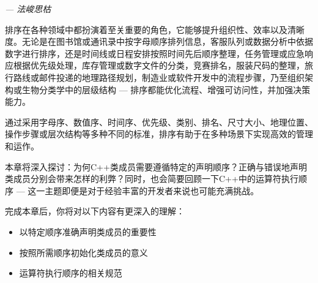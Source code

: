 
\begin{flushright}
\textit{--- 法峻思枯}
\end{flushright}

排序在各种领域中都扮演着至关重要的角色，它能够提升组织性、效率以及清晰度。无论是在图书馆或通讯录中按字母顺序排列信息，客服队列或数据分析中依据数字进行排序，还是时间线或日程安排按照时间先后顺序整理，任务管理或应急响应根据优先级处理，库存管理或数字文件的分类，竞赛排名，服装尺码的整理，旅行路线或邮件投递的地理路径规划，制造业或软件开发中的流程步骤，乃至组织架构或生物分类学中的层级结构 --- 排序都能优化流程、增强可访问性，并加强决策能力。

通过采用字母序、数值序、时间序、优先级、类别、排名、尺寸大小、地理位置、操作步骤或层次结构等多种不同的标准，排序有助于在多种场景下实现高效的管理和运作。

本章将深入探讨：为何C++类成员需要遵循特定的声明顺序？正确与错误地声明类成员分别会带来怎样的利弊？同时，也会简要回顾一下C++中的运算符执行顺序 --- 这一主题即便是对于经验丰富的开发者来说也可能充满挑战。

完成本章后，你将对以下内容有更深入的理解：

\begin{itemize}
\item 
以特定顺序准确声明类成员的重要性

\item 
按照所需顺序初始化类成员的意义

\item 
运算符执行顺序的相关规范
\end{itemize}













